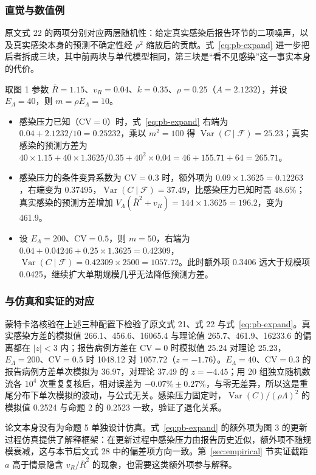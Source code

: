 \subsubsection{直觉与数值例}

原文式 22 的两项分别对应两层随机性：给定真实感染后报告环节的二项噪声，以及真实感染本身的预测不确定性经 $\rho^2$ 缩放后的贡献。式~\eqref{eq:pb-expand} 进一步把后者拆成三块，其中前两块与单代模型相同，第三块是“看不见感染”这一事实本身的代价。

取图 1 参数 $\bar R=1.15$、$v_R=0.04$、$k=0.35$、$\rho=0.25$（$A=2.1232$），并设 $E_\Lambda=40$，则 $m=\rho E_\Lambda=10$。
\begin{itemize}
\item 感染压力已知（$\mathrm{CV}=0$）时，式~\eqref{eq:pb-expand} 右端为 $0.04+2.1232/10=0.25232$，乘以 $m^2=100$ 得 $\operatorname{Var}(C\mid\mathcal F)=25.23$；真实感染的预测方差为 $40\times1.15+40\times1.3625/0.35+40^2\times0.04=46+155.71+64=265.71$。
\item 感染压力的条件变异系数为 $\mathrm{CV}=0.3$ 时，额外项为 $0.09\times1.3625=0.12263$，右端变为 $0.37495$，$\operatorname{Var}(C\mid\mathcal F)=37.49$，比感染压力已知时高 48.6\%；真实感染的预测方差增加 $V_\Lambda(\bar R^2+v_R)=144\times1.3625=196.2$，变为 461.9。
\item 设 $E_\Lambda=200$、$\mathrm{CV}=0.5$，则 $m=50$，右端为 $0.04+0.04246+0.25\times1.3625=0.42309$，$\operatorname{Var}(C\mid\mathcal F)=0.42309\times2500=1057.72$。此时额外项 0.3406 远大于规模项 0.0425，继续扩大单期规模几乎无法降低预测方差。
\end{itemize}

\subsubsection{与仿真和实证的对应}

蒙特卡洛核验在上述三种配置下检验了原文式 21、式 22 与式~\eqref{eq:pb-expand}。真实感染方差的模拟值 266.1、456.6、16065.4 与理论值 265.7、461.9、16233.6 的偏离都在 $|z|<3$ 内；报告病例方差在 $\mathrm{CV}=0$ 时模拟值 25.24 对理论 25.23，$E_\Lambda=200$、$\mathrm{CV}=0.5$ 时 1048.12 对 1057.72（$z=-1.76$）。$E_\Lambda=40$、$\mathrm{CV}=0.3$ 的报告病例方差单次模拟为 36.97，对理论 37.49 的 $z=-4.45$；用 20 组独立随机数流各 $10^4$ 次重复复核后，相对误差为 $-0.07\%\pm0.27\%$，与零无差异，所以这是重尾分布下单次模拟的波动，与公式无关。感染压力固定时，$\operatorname{Var}(C)/(\rho\Lambda)^2$ 的模拟值 0.2524 与命题 2 的 0.2523 一致，验证了退化关系。

论文本身没有为命题 5 单独设计仿真。式~\eqref{eq:pb-expand} 的额外项为图 3 的更新过程仿真提供了解释框架：在更新过程中感染压力由报告历史近似，额外项不随规模衰减，这与本节后文式 28 中的偏差项方向一致。第~\ref{sec:empirical} 节实证截距 $a$ 高于情景隐含 $v_R/\bar R^2$ 的现象，也需要这类额外项参与解释。

